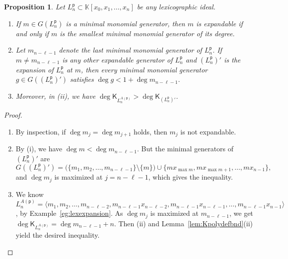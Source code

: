 \documentclass[12pt]{amsart}%
\newtheorem{proposition}[theorem]{Proposition}
\theoremstyle{definition}%
\newcommand{\hp}{\mathsf{p}}%
\newcommand{\plus}{A}%
\newcommand{\hk}{\mathsf{K}}%
\newcommand{\kk}{\mathbb{K}}%
\begin{document}
\begin{proposition} 
  \label{prop:Kpolycommence}
  Let $L^{\hp}_n \subset \kk[x_0, x_1, \dotsc , x_n]$ be any
  lexicographic ideal.
  \begin{enumerate}
  \item If $m \in G(L^{\hp}_n)$ is a minimal monomial generator, then
    $m$ is expandable if and only if $m$ is the smallest minimal
    monomial generator of its degree. %
    
  \item Let $m_{n - \ell - 1}$ denote the last minimal monomial
    generator of $L^{\hp}_n$.  If $m \neq m_{n - \ell - 1}$ is any
    other expandable generator of $L^{\hp}_n$ and $(L^{\hp}_n)'$ is
    the expansion of $L^{\hp}_n$ at $m$, then every minimal monomial
    generator $g \in G((L^{\hp}_n)')$ satisfies $\deg g < 1 + \deg
    m_{n - \ell - 1}$.
    
  \item Moreover, in (ii), we have $\deg \hk_{L^{\plus (\hp)}_n} >
    \deg \hk_{(L^{\hp}_n)'}$.
\end{enumerate}
\end{proposition}

\begin{proof} $\;$
  \begin{enumerate}
  \item By inspection, if $\deg m_j = \deg m_{j+1}$ holds, then $m_j$
    is not expandable.

  \item By (i), we have $\deg m < \deg m_{n-\ell-1}$.  But the minimal
    generators of $(L^{\hp}_n)'$ are
    \[ 
    G((L^{\hp}_n)') = \bigl( \{ m_1, m_2, \dotsc, m_{n-\ell-1} \}
    \setminus \{ m \} \bigr) \cup \bigl\{ m x_{\max m}, m x_{\max m
      +1}, \dotsc, m x_{n-1} \bigr\},
    \]
    and $\deg m_j$ is maximized at $j = n-\ell-1$, which gives the
    inequality.

  \item We know $L^{\plus (\hp)}_n = \langle m_1, m_2, \dotsc,
    m_{n-\ell-2}, m_{n-\ell-1} x_{n-\ell-2}, m_{n-\ell-1}
    x_{n-\ell-1}, \dotsc, m_{n-\ell-1} x_{n-1} \rangle$, by
    Example~\ref{eg:lexexpansion}.  As $\deg m_j$ is maximized at
    $m_{n-\ell-1}$, we get $\deg \hk_{L^{\plus (\hp)}_n} = \deg
    m_{n-\ell-1} + n$.  Then (ii) and Lemma~\ref{lem:Kpolydefbnd}(ii)
    yield the desired inequality. \qedhere
  \end{enumerate}
\end{proof}
\end{document}
